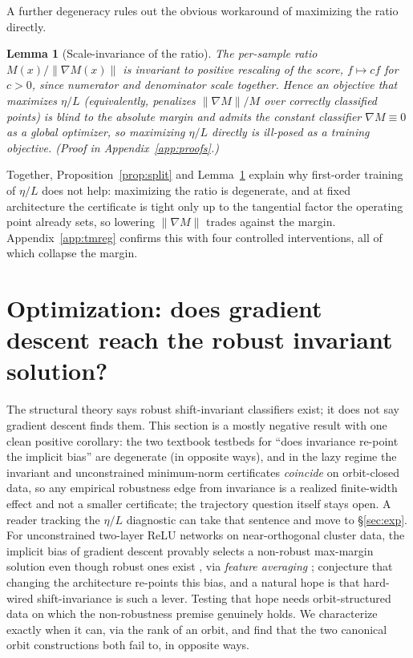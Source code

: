 \documentclass{article}
\newtheorem{lemma}{Lemma}
\theoremstyle{definition}
\begin{document}
A further degeneracy rules out the obvious workaround of maximizing the ratio directly.
\begin{lemma}[Scale-invariance of the ratio]\label{lem:ratiodegen}
The per-sample ratio $M(x)/\|\nabla M(x)\|$ is invariant to positive rescaling of the score, $f\mapsto cf$ for $c>0$, since numerator and denominator scale together. Hence an objective that maximizes $\eta/L$ (equivalently, penalizes $\|\nabla M\|/M$ over correctly classified points) is blind to the absolute margin and admits the constant classifier $\nabla M\equiv0$ as a global optimizer, so maximizing $\eta/L$ directly is ill-posed as a training objective. (Proof in Appendix~\ref{app:proofs}.)
\end{lemma}

Together, Proposition~\ref{prop:split} and Lemma~\ref{lem:ratiodegen} explain why first-order training of $\eta/L$ does not help: maximizing the ratio is degenerate, and at fixed architecture the certificate is tight only up to the tangential factor the operating point already sets, so lowering $\|\nabla M\|$ trades against the margin. Appendix~\ref{app:tmreg} confirms this with four controlled interventions, all of which collapse the margin.

\section{Optimization: does gradient descent reach the robust invariant solution?}\label{sec:opt}
The structural theory says robust shift-invariant classifiers exist; it does not say gradient descent finds them. This section is a mostly negative result with one clean positive corollary: the two textbook testbeds for ``does invariance re-point the implicit bias'' are degenerate (in opposite ways), and in the lazy regime the invariant and unconstrained minimum-norm certificates \emph{coincide} on orbit-closed data, so any empirical robustness edge from invariance is a realized finite-width effect and not a smaller certificate; the trajectory question itself stays open. A reader tracking the $\eta/L$ diagnostic can take that sentence and move to \S\ref{sec:exp}. For unconstrained two-layer ReLU networks on near-orthogonal cluster data, the implicit bias of gradient descent provably selects a non-robust max-margin solution even though robust ones exist \citep{vardi2022gradient,frei2023double}, via \emph{feature averaging} \citep{li2025feature}; \citet{min2024can} conjecture that changing the architecture re-points this bias, and a natural hope is that hard-wired shift-invariance is such a lever. Testing that hope needs orbit-structured data on which the non-robustness premise genuinely holds. We characterize exactly when it can, via the rank of an orbit, and find that the two canonical orbit constructions both fail to, in opposite ways.
\end{document}
